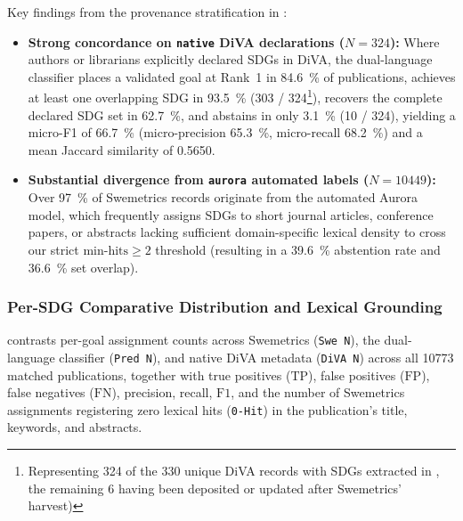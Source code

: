 Key findings from the provenance stratification in :
\begin{itemize}
  \item \textbf{Strong concordance on \texttt{native} \gls{DiVA} declarations ($N = \num{324}$):} Where authors or librarians explicitly declared \glspl{SDG} in \gls{DiVA}, the dual-language classifier places a validated goal at Rank~1 in \qty{84.6}{\percent} of publications, achieves at least one overlapping SDG in \qty{93.5}{\percent} (\num{303} / \num{324}\footnote{Representing \num{324} of the \num{330} unique \gls{DiVA} records with \glspl{SDG} extracted in , the remaining \num{6} having been deposited or updated after Swemetrics' harvest)}), recovers the complete declared SDG set in \qty{62.7}{\percent}, and abstains in only \qty{3.1}{\percent} (\num{10} / \num{324}), yielding a micro-F1 of \qty{66.7}{\percent} (micro-precision \qty{65.3}{\percent}, micro-recall \qty{68.2}{\percent}) and a mean Jaccard similarity of
  \num[group-minimum-digits=0]{0.5650}.
  
  \item \textbf{Substantial divergence from \texttt{aurora} automated labels ($N = \num{10449}$):} Over \qty{97}{\percent} of Swemetrics records originate from the automated Aurora model, which frequently assigns \glspl{SDG} to short journal articles, conference papers, or abstracts lacking sufficient domain-specific lexical density to cross our strict $\text{min-hits} \ge 2$ threshold (resulting in a \qty{39.6}{\percent} abstention rate and \qty{36.6}{\percent} set overlap).
\end{itemize}

\subsubsection{Per-SDG Comparative Distribution and Lexical Grounding}

 contrasts per-goal assignment counts across Swemetrics (\texttt{Swe N}), the dual-language classifier (\texttt{Pred N}), and native \gls{DiVA} metadata (\texttt{DiVA N}) across all \num{10773} matched publications, together with true positives ($\text{TP}$), false positives ($\text{FP}$), false negatives ($\text{FN}$), precision, recall, $\text{F1}$, and the number of Swemetrics assignments registering zero lexical hits (\texttt{0-Hit}) in the publication's title, keywords, and abstracts.

